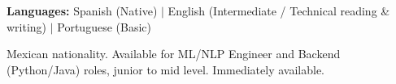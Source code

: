 \documentclass[10pt,letterpaper]{article}
\begin{document}
\vspace{0.15cm}
\noindent
{\small\bfseries\color{primary} Languages:}\hspace{0.3cm}
{\small Spanish (Native) \;$\mid$\; English (Intermediate / Technical reading \& writing) \;$\mid$\; Portuguese (Basic)}

\vspace{0.15cm}
\noindent
{\small\color{textsec} Mexican nationality. Available for ML/NLP Engineer and Backend (Python/Java) roles, junior to mid level. Immediately available.}
\end{document}
